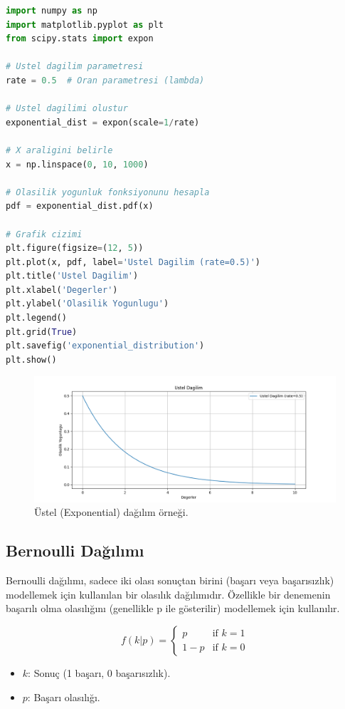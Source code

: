 \begin{lstlisting}[language=Python]
import numpy as np
import matplotlib.pyplot as plt
from scipy.stats import expon

# Ustel dagilim parametresi
rate = 0.5  # Oran parametresi (lambda)

# Ustel dagilimi olustur
exponential_dist = expon(scale=1/rate)

# X araligini belirle
x = np.linspace(0, 10, 1000)

# Olasilik yogunluk fonksiyonunu hesapla
pdf = exponential_dist.pdf(x)

# Grafik cizimi
plt.figure(figsize=(12, 5))
plt.plot(x, pdf, label='Ustel Dagilim (rate=0.5)')
plt.title('Ustel Dagilim')
plt.xlabel('Degerler')
plt.ylabel('Olasilik Yogunlugu')
plt.legend()
plt.grid(True)
plt.savefig('exponential_distribution')
plt.show()
\end{lstlisting}

\begin{figure}[h]
    \centering
    \includegraphics[width=1\textwidth]{images/exponential_distribution.png}
    \caption{Üstel (Exponential) dağılım örneği.}
    \label{fig:enter-label}
\end{figure}

\newpage

\subsection{Bernoulli Dağılımı}
Bernoulli dağılımı, sadece iki olası sonuçtan birini (başarı veya başarısızlık) modellemek için kullanılan bir olasılık dağılımıdır. Özellikle bir denemenin başarılı olma olasılığını (genellikle p ile gösterilir) modellemek için kullanılır.

\[f(k|p) = \begin{cases} p & \text{if } k = 1 \\ 1 - p & \text{if } k = 0 \end{cases}\]
\begin{itemize}
	\item $k$: Sonuç (1 başarı, 0 başarısızlık).
	\item $p$: Başarı olasılığı.
\end{itemize}

